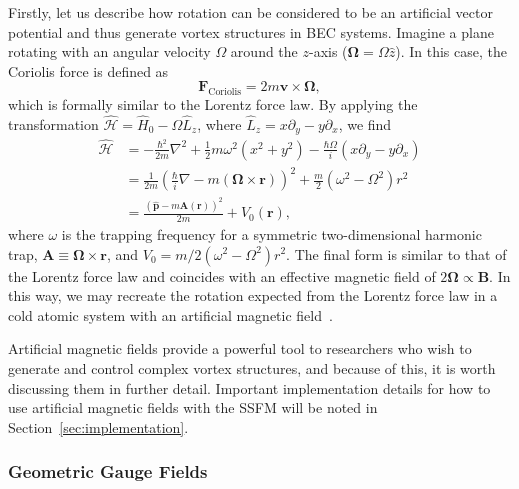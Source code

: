 Firstly, let us describe how rotation can be considered to be an artificial vector potential and thus generate vortex structures in BEC systems.
Imagine a plane rotating with an angular velocity $\Omega$ around the $z$-axis ($\mathbf{\Omega} = \Omega \hat z$). 
In this case, the Coriolis force is defined as
\begin{equation}
\mathbf{F}_{\text{Coriolis}} = 2m \mathbf{v} \times \mathbf{\Omega},
\end{equation}
which is formally similar to the Lorentz force law.
By applying the transformation $\mathcal{\hat H} = \hat H_0 - \Omega \hat L_z$, where $\hat L_z = x\partial_y - y\partial_x$, we find~\cite{bhat2008}
\begin{equation}
\begin{split}
\mathcal{\hat H} &= -\frac{\hbar^2}{2m}\nabla^2 + \frac 1 2 m \omega^2(x^2 + y^2) - \frac{\hbar \Omega}{i}(x\partial_y - y\partial_x) \\
 &= \frac{1}{2m}\left(\frac{\hbar}{i}\nabla - m(\mathbf{\Omega} \times \mathbf{r})\right)^2 + \frac m 2 \left( \omega^2 - \Omega^2 \right)r^2 \\
 &= \frac{(\hat{\mathbf{p}}-m\mathbf{A}(\mathbf{r}))^2}{2m}+ V_0(\mathbf{r}),
\end{split}
\end{equation}
where $\omega$ is the trapping frequency for a symmetric two-dimensional harmonic trap, $\mathbf{A} \equiv \mathbf{\Omega} \times \mathbf{r}$, and $V_0 = m/2 \left( \omega^2 - \Omega^2 \right)r^2$.
The final form is similar to that of the Lorentz force law and coincides with an effective magnetic field of $2 \mathbf \Omega \propto \mathbf B$.
In this way, we may recreate the rotation expected from the Lorentz force law in a cold atomic system with an artificial magnetic field~\cite{peshkin1989, madison2000, abo2001}.

Artificial magnetic fields provide a powerful tool to researchers who wish to generate and control complex vortex structures, and because of this, it is worth discussing them in further detail.
Important implementation details for how to use artificial magnetic fields with the SSFM will be noted in Section~\ref{sec:implementation}.

\subsubsection{Geometric Gauge Fields}
\label{sec:geom}

